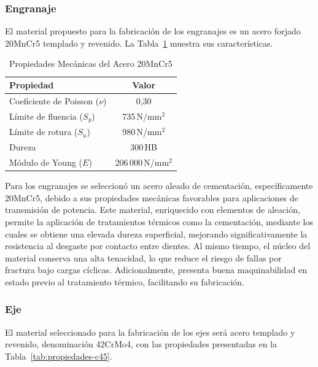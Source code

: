 \documentclass[conference]{IEEEtran}
\begin{document}
\subsubsection{Engranaje}

El material propuesto para la fabricación de los engranajes es un acero forjado 20MnCr5
templado y revenido. La Tabla~\ref{tab:propiedades-20mncr5} muestra sus características.

\begin{table}[H]
\centering
\caption{Propiedades Mecánicas del Acero 20MnCr5 \cite{ipargama}}
\label{tab:propiedades-20mncr5}
\begin{tabular}{lc}
\hline
\textbf{Propiedad} & \textbf{Valor} \\
\hline
Coeficiente de Poisson ($\nu$) & 0{,}30                     \\
Límite de fluencia ($S_y$)     & 735\,N/mm$^2$              \\
Límite de rotura ($S_u$)       & 980\,N/mm$^2$              \\
Dureza                         & 300\,HB                    \\
Módulo de Young ($E$)          & 206\,000\,N/mm$^2$         \\
\hline
\end{tabular}
\end{table}

Para los engranajes se seleccionó un acero aleado de cementación, específicamente
20MnCr5, debido a sus propiedades mecánicas favorables para aplicaciones de transmisión
de potencia. Este material, enriquecido con elementos de aleación, permite la aplicación de
tratamientos térmicos como la cementación, mediante los cuales se obtiene una elevada
dureza superficial, mejorando significativamente la resistencia al desgaste por contacto
entre dientes. Al mismo tiempo, el núcleo del material conserva una alta tenacidad, lo que
reduce el riesgo de fallas por fractura bajo cargas cíclicas. Adicionalmente, presenta
buena maquinabilidad en estado previo al tratamiento térmico, facilitando su fabricación.

\subsubsection{Eje}

El material seleccionado para la fabricación de los ejes será acero templado y revenido,
denominación 42CrMo4, con las propiedades presentadas en la
Tabla~\ref{tab:propiedades-c45}.
\end{document}
